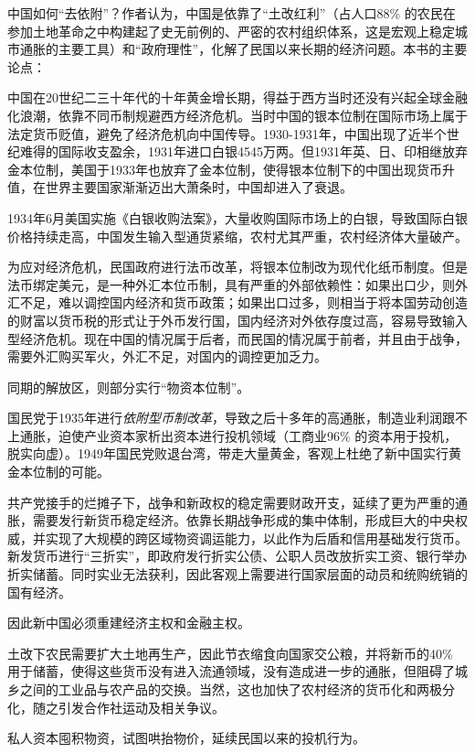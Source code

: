 中国如何“去依附”？作者认为，中国是依靠了“土改红利”（占人口88\% 的农民在参加土地革命之中构建起了史无前例的、严密的农村组织体系，这是宏观上稳定城市通胀的主要工具）和“政府理性”，化解了民国以来长期的经济问题。本书的主要论点：
\begin{itemize*}
    \item 中国在20世纪二三十年代的十年黄金增长期，得益于西方当时还没有兴起全球金融化浪潮，依靠不同币制规避西方经济危机。当时中国的银本位制在国际市场上属于法定货币贬值，避免了经济危机向中国传导。1930-1931年，中国出现了近半个世纪难得的国际收支盈余，1931年进口白银4545万两。但1931年英、日、印相继放弃金本位制，美国于1933年也放弃了金本位制，使得银本位制下的中国出现货币升值，在世界主要国家渐渐迈出大萧条时，中国却进入了衰退。
    \item 1934年6月美国实施《白银收购法案》，大量收购国际市场上的白银，导致国际白银价格持续走高，中国发生输入型通货紧缩，农村尤其严重，农村经济体大量破产。
    \item 为应对经济危机，民国政府进行法币改革，将银本位制改为现代化纸币制度。但是法币绑定美元，是一种外汇本位币制，具有严重的外部依赖性：如果出口少，则外汇不足，难以调控国内经济和货币政策；如果出口过多，则相当于将本国劳动创造的财富以货币税的形式让于外币发行国，国内经济对外依存度过高，容易导致输入型经济危机。现在中国的情况属于后者，而民国的情况属于前者，并且由于战争，需要外汇购买军火，外汇不足，对国内的调控更加乏力。
    \item 同期的解放区，则部分实行“物资本位制”。
    \item 国民党于1935年进行\emph{依附型币制改革}，导致之后十多年的高通胀，制造业利润跟不上通胀，迫使产业资本家析出资本进行投机领域（工商业96\% 的资本用于投机，脱实向虚）。1949年国民党败退台湾，带走大量黄金，客观上杜绝了新中国实行黄金本位制的可能。
    \item 共产党接手的烂摊子下，战争和新政权的稳定需要财政开支，延续了更为严重的通胀，需要发行新货币稳定经济。依靠长期战争形成的集中体制，形成巨大的中央权威，并实现了大规模的跨区域物资调运能力，以此作为后盾和信用基础发行货币。新发货币进行“三折实”，即政府发行折实公债、公职人员改放折实工资、银行举办折实储蓄。同时实业无法获利，因此客观上需要进行国家层面的动员和统购统销的国有经济。
    \item 因此新中国必须重建经济主权和金融主权。
    \item 土改下农民需要扩大土地再生产，因此节衣缩食向国家交公粮，并将新币的40\% 用于储蓄，使得这些货币没有进入流通领域，没有造成进一步的通胀，但阻碍了城乡之间的工业品与农产品的交换。当然，这也加快了农村经济的货币化和两极分化，随之引发合作社运动及相关争议。
    \item 私人资本囤积物资，试图哄抬物价，延续民国以来的投机行为。

\end{itemize*}
